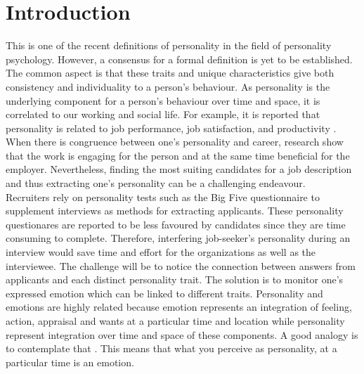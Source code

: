 \chapter{Introduction}
 \cite{personality-definition-BERGNER2020100759} This is one of the recent definitions of personality in the field of personality psychology. However, a consensus for a formal definition is yet to be established. The common aspect is that these traits and unique characteristics give both consistency and individuality to a person's behaviour. As personality is the underlying component for a person's behaviour over time and space, it is correlated to our working and social life. For example, it is reported that personality is related to job performance, job satisfaction, and productivity \cite{personality-prediction-questions-9121971}. When there is congruence between one’s personality and career, research show that the work is engaging for the person and at the same time beneficial for the employer. Nevertheless, finding the most suiting candidates for a job description and thus extracting one's personality can be a challenging endeavour. \\

Recruiters rely on personality tests such as the Big Five questionnaire to supplement interviews as methods for extracting applicants. These personality questionares are reported to be less favoured by candidates since they are time consuming to complete. Therefore, interfering job-seeker's personality during an interview would save time and effort for the organizations as well as the interviewee. The challenge will be to notice the connection between answers from applicants and each distinct personality trait. The solution is to monitor one's expressed emotion  which can be linked to different traits. Personality and emotions are highly related because emotion represents an integration of feeling, action, appraisal and wants at a particular time and location while personality represent integration over time and space of these components. A good analogy is to contemplate that  \cite{personality-and-emotion-revelle2009personality}. This means that what you perceive as personality, at a particular time is an emotion.  \\ 

